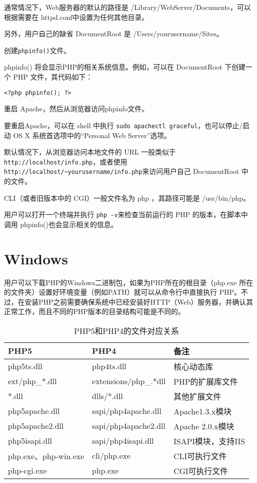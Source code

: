\begin{compactenum}
通常情况下，Web服务器的默认的路径是 /Library/WebServer/Documents，可以根据需要在 httpd.conf中设置为任何其他目录。

另外，用户自己的缺省 DocumentRoot 是 /Users/yourusername/Sites。

\item 创建\texttt{phpinfo()}文件。

phpinfo() 将会显示PHP的相关系统信息。例如，可以在 DocumentRoot 下创建一个 PHP 文件，其代码如下：

\indent \indent \verb|<?php phpinfo(); ?>|

\item 重启 Apache，然后从浏览器访问phpinfo文件。

要重启Apache，可以在 shell 中执行 \texttt{sudo apachectl graceful}，也可以停止/启动 OS X 系统首选项中的“Personal Web Server”选项。

默认情况下，从浏览器访问本地文件的 URL 一般类似于\texttt{http://localhost/info.php}，或者使用\verb|http://localhost/~yourusername/info.php|来访问用户自己 DocumentRoot 中的文件。
\end{compactenum}

CLI（或者旧版本中的 CGI）一般文件名为 php ，其路径可能是 /usr/bin/php。

用户可以打开一个终端并执行 \texttt{php -v}来检查当前运行的 PHP 的版本，在脚本中调用 phpinfo()也会显示相关的信息。



\section{Windows}

用户可以下载PHP的Windows二进制包，如果为PHP所在的根目录（php.exe 所在的文件夹）设置好环境变量（例如PATH）就可以从命令行中直接执行 PHP。不过，在安装PHP之前需要确保系统中已经安装好HTTP（Web）服务器，并确认其正常工作，而且不同的PHP版本的目录结构可能是不同的。


\begin{table}[htbp]
\centering
\caption{PHP5和PHP4的文件对应关系}

\begin{tabular}{|l|l|l|}
\hline
PHP5 & PHP4 &备注\\
\hline
php5ts.dll & php4ts.dll & 核心动态库\\
\hline
ext/php\_*.dll & extensions/php\_.*dll & PHP的扩展库文件\\
\hline
*.dll & dlls/*.dll & 其他扩展文件\\
\hline
php5apache.dll & sapi/php4apache.dll & Apache1.3.x模块\\
\hline
php5apache2.dll & sapi/php4apache2.dll & Apache 2.0.x模块\\
\hline
php5isapi.dll & sapi/php4isapi.dll & ISAPI模块，支持IIS\\
\hline
php.exe、php-win.exe& cli/php.exe& CLI可执行文件\\
\hline
php-cgi.exe & php.exe & CGI可执行文件\\
\hline
\end{tabular}
\end{table}

